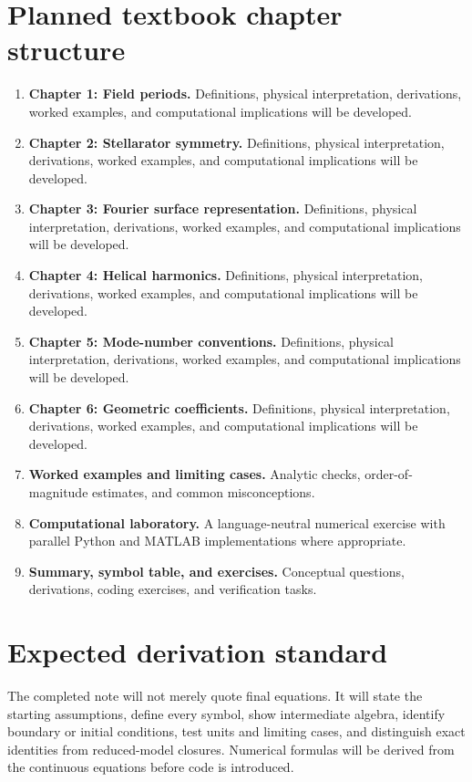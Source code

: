 \documentclass[11pt]{article}
\begin{document}
\section{Planned textbook chapter structure}
\begin{enumerate}[leftmargin=1.8em]
\item \textbf{Chapter 1: Field periods.} Definitions, physical interpretation, derivations, worked examples, and computational implications will be developed.
\item \textbf{Chapter 2: Stellarator symmetry.} Definitions, physical interpretation, derivations, worked examples, and computational implications will be developed.
\item \textbf{Chapter 3: Fourier surface representation.} Definitions, physical interpretation, derivations, worked examples, and computational implications will be developed.
\item \textbf{Chapter 4: Helical harmonics.} Definitions, physical interpretation, derivations, worked examples, and computational implications will be developed.
\item \textbf{Chapter 5: Mode-number conventions.} Definitions, physical interpretation, derivations, worked examples, and computational implications will be developed.
\item \textbf{Chapter 6: Geometric coefficients.} Definitions, physical interpretation, derivations, worked examples, and computational implications will be developed.
\item \textbf{Worked examples and limiting cases.} Analytic checks, order-of-magnitude estimates, and common misconceptions.
\item \textbf{Computational laboratory.} A language-neutral numerical exercise with parallel Python and MATLAB implementations where appropriate.
\item \textbf{Summary, symbol table, and exercises.} Conceptual questions, derivations, coding exercises, and verification tasks.
\end{enumerate}

\section{Expected derivation standard}
The completed note will not merely quote final equations. It will state the starting assumptions, define every symbol, show intermediate algebra, identify boundary or initial conditions, test units and limiting cases, and distinguish exact identities from reduced-model closures. Numerical formulas will be derived from the continuous equations before code is introduced.
\end{document}
